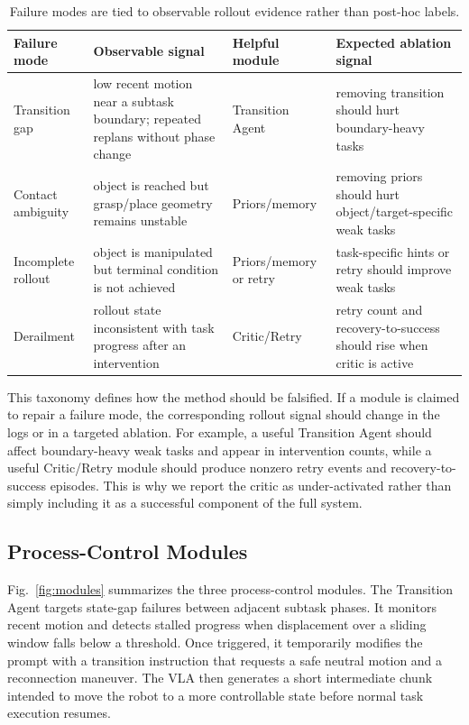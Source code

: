\documentclass[runningheads]{waica}
\begin{document}
\begin{table}
\caption{Failure modes are tied to observable rollout evidence rather than post-hoc labels.}
\label{tab:taxonomy}
\centering
\small
\begin{tabularx}{\textwidth}{p{}p{}p{}X}
\toprule
Failure mode & Observable signal & Helpful module & Expected ablation signal \\
\midrule
Transition gap & low recent motion near a subtask boundary; repeated replans without phase change & Transition Agent & removing transition should hurt boundary-heavy tasks \\
Contact ambiguity & object is reached but grasp/place geometry remains unstable & Priors/memory & removing priors should hurt object/target-specific weak tasks \\
Incomplete rollout & object is manipulated but terminal condition is not achieved & Priors/memory or retry & task-specific hints or retry should improve weak tasks \\
Derailment & rollout state inconsistent with task progress after an intervention & Critic/Retry & retry count and recovery-to-success should rise when critic is active \\
\bottomrule
\end{tabularx}
\end{table}

This taxonomy defines how the method should be falsified.
If a module is claimed to repair a failure mode, the corresponding rollout signal should change in the logs or in a targeted ablation.
For example, a useful Transition Agent should affect boundary-heavy weak tasks and appear in intervention counts, while a useful Critic/Retry module should produce nonzero retry events and recovery-to-success episodes.
This is why we report the critic as under-activated rather than simply including it as a successful component of the full system.

\subsection{Process-Control Modules}

Fig.~\ref{fig:modules} summarizes the three process-control modules.
The Transition Agent targets state-gap failures between adjacent subtask phases.
It monitors recent motion and detects stalled progress when displacement over a sliding window falls below a threshold.
Once triggered, it temporarily modifies the prompt with a transition instruction that requests a safe neutral motion and a reconnection maneuver.
The VLA then generates a short intermediate chunk intended to move the robot to a more controllable state before normal task execution resumes.
\end{document}
